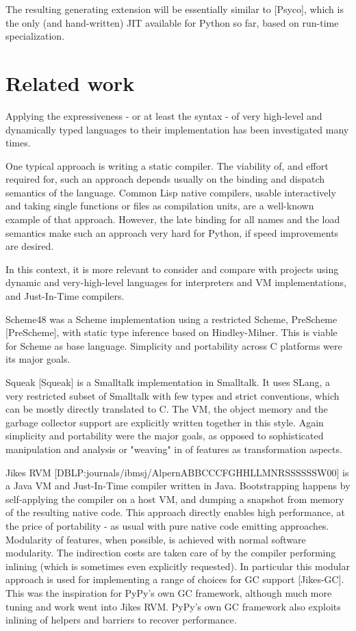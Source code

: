 \documentclass{acm_proc_article-sp}
\begin{document}
The resulting generating extension will be essentially similar to
[Psyco], which is the only (and hand-written) JIT available for Python so
far, based on run-time specialization.



\section{Related work}
\label{relatedwork}


Applying the expressiveness - or at least the syntax - of very
high-level and dynamically typed languages to their implementation has
been investigated many times.

One typical approach is writing a static compiler.  The viability of,
and effort required for, such an approach depends usually on the binding
and dispatch semantics of the language.  Common Lisp native compilers,
usable interactively and taking single functions or files as compilation
units, are a well-known example of that approach.  However, the late
binding for all names and the load semantics make such an approach very
hard for Python, if speed improvements are desired.

In this context, it is more relevant to consider and compare with
projects using dynamic and very-high-level languages for interpreters
and VM implementations, and Just-In-Time compilers.

Scheme48 was a Scheme implementation using a restricted Scheme, PreScheme
[PreScheme], with static type inference based on Hindley-Milner.  This is
viable for Scheme as base language.  Simplicity and portability across C
platforms were its major goals.

Squeak [Squeak] is a Smalltalk implementation in Smalltalk. It uses SLang, a
very restricted subset of Smalltalk with few types and strict
conventions, which can be mostly directly translated to C.
The VM, the object memory and the garbage collector support are
explicitly written together in this style. Again simplicity and
portability were the major goals, as opposed to sophisticated manipulation
and analysis or "weaving" in of features as transformation aspects.

Jikes RVM [DBLP:journals/ibmsj/AlpernABBCCCFGHHLLMNRSSSSSSW00] is a
Java VM and Just-In-Time compiler written in Java.
Bootstrapping happens by self-applying the compiler on a host VM, and
dumping a snapshot from memory of the resulting native code.
This approach directly enables high performance, at the price of
portability - as usual with pure native code emitting
approaches. Modularity of features, when possible, is achieved with
normal software modularity. The indirection costs are taken care of by
the compiler performing inlining (which is sometimes even explicitly
requested).  In particular this modular approach is used
for implementing a range of choices for GC support [Jikes-GC].  This was
the inspiration for PyPy's own GC framework, although much more tuning
and work went into Jikes RVM.  PyPy's own GC framework also exploits
inlining of helpers and barriers to recover performance.
\end{document}
